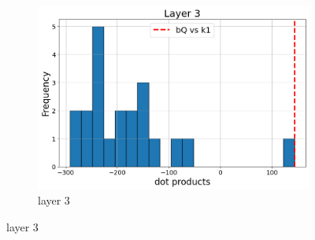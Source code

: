 \documentclass[11pt]{article}
\begin{document}
\begin{figure}[t]
  \begin{subfigure}[t]{0.24\textwidth}
    \centering
    \includegraphics[width=1.4\columnwidth]{figures/obs1_appendix/obs1_layer3.png}
    \caption{layer 3}
  \end{subfigure}\hfill
    \vspace{2mm}


\end{figure}
\end{document}
